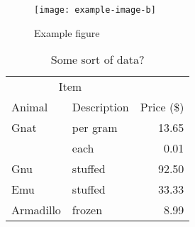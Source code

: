 \Blindtext

\begin{figure}[t]
    \texttt{[image: example-image-b]}
    \caption{Example figure}
\end{figure}

\Blindtext

\begin{table}[b]
    \centering
    \begin{tabular}{llr}
        \toprule
        \multicolumn{2}{c}{Item} \\
        \cmidrule(r){1-2}
        Animal    & Description & Price (\$) \\
        \midrule
        Gnat      & per gram    & 13.65      \\
            &    each     & 0.01       \\
        Gnu       & stuffed     & 92.50      \\
        Emu       & stuffed     & 33.33      \\
        Armadillo & frozen      & 8.99       \\
        \bottomrule
    \end{tabular}
    \caption{Some sort of data?}
\end{table}
